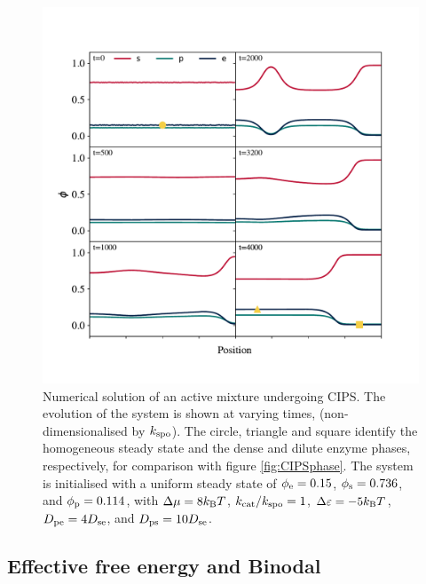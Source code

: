 \begin{figure}
    \centering
    \includegraphics[width=\textwidth]{figures/2-cips-figs/CIPSnumeric.pdf}
    \caption{Numerical solution of an active mixture undergoing CIPS. The evolution of the system is shown at varying times, (non-dimensionalised by $k_{\mathrm{spo}}$). The circle, triangle and square identify the homogeneous steady state and the dense and dilute enzyme phases, respectively, for comparison with figure \ref{fig:CIPSphase}. The system is initialised with a uniform steady state of $\phi_{\mathrm{e}}=0.15$, $\phi_{\mathrm{s}}=0.736$, and $\phi_{\mathrm{p}}=0.114$, with $\Delta\mu=8 k_{\rm B} T$, $k_{\mathrm{cat}}/k_{\mathrm{spo}}=1$, $\Delta \varepsilon=-5 k_{\rm B} T$, $D_{\mathrm{pe}}=4 D_{\mathrm{se}}$, and $D_{\mathrm{ps}}=10 D_{\mathrm{se}}$.}
    \label{fig:CIPSnumeric}
\end{figure}

\subsection{Effective free energy and Binodal}

